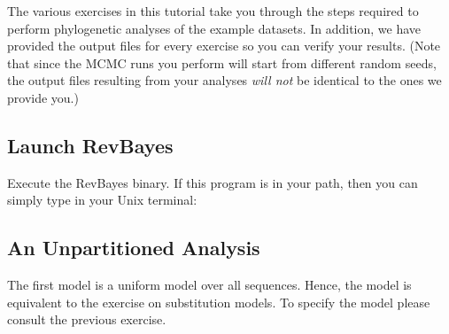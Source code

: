 \documentclass[11pt]{article}
\newcommand{\taha}[1]{{\textcolor{red}{[TAH comment: #1]}}} %
\newcommand{\cl}[1]{{\texttt{\textbf{#1}}}}
\begin{document}
The various exercises in this tutorial take you through the steps required to perform phylogenetic analyses of the example datasets. 
In addition, we have provided the output files for every exercise so you can verify your results. (Note that since the MCMC runs you perform will start from different random seeds, the output files resulting from your analyses \textit{will not} be identical to the ones we provide you.)







\bigskip
\subsection{Launch RevBayes}

Execute the RevBayes binary. If this program is in your path, then you can simply type in your Unix terminal:

\exs{\cl{\$ rb}}



\bigskip
\subsection{An Unpartitioned Analysis}\label{secUnif} 

The first model is a uniform model over all sequences.
Hence, the model is equivalent to the exercise on substitution models.
To specify the model please consult the previous exercise.
\end{document}
